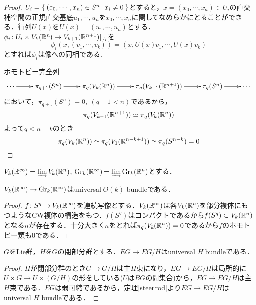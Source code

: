 \begin{proof}
  $U_i=\left\{\:(x_0,\cdots,x_n)\in S^n\:\middle|\:x_i\neq 0\:\right\}$とすると，$x=(x_0,\cdots,x_n)\in U_i$の直交補空間の正規直交基底$u_1,\cdots,u_n$を$x_0,\cdots,x_n$に関してなめらかにとることができる．行列$U(x)$を$U(x)=(u_1,\cdots,u_n)$とする．$\phi_i\colon U_i\times V_k(\mathbb{R}^n)\rightarrow V_{k+1}(\mathbb{R}^{n+1})|_{U_i}$を
  \[
  \phi_i(x,(v_1,\cdots,v_k)) = (x,U(x)v_1,\cdots,U(x)v_k)
  \]
  とすれば$\phi_i$は像への同相である．

  ホモトピー完全列
  \[
  \xymatrix{
    \cdots \ar[r] & \pi_{q+1}(S^n) \ar[r] & \pi_q(V_k(\real^n)) \ar[r] &
    \pi_q(V_{k+1}(\real^{n+1})) \ar[r] & \pi_q(S^n) \ar[r] & \cdots
  }
  \]
  において，$\pi_{q+1}(S^n) = 0,\:(q+1 < n)$であるから，
  \[
  \pi_q(V_{k+1}(\mathbb{R}^{n+1}))\simeq \pi_q(V_{k}(\mathbb{R}^{n}))
  \]
  よって$q<n-k$のとき
  \[
  \pi_q(V_k(\mathbb{R}^n))\simeq \pi_q(V_1(\mathbb{R}^{n-k+1}))\simeq \pi_q(S^{n-k})=0
  \]
\end{proof}

$V_k(\mathbb{R}^\infty)=\varinjlim V_k(\mathbb{R}^n)$, $\text{Gr}_k(\mathbb{R}^\infty)=\varinjlim \text{Gr}_k(\mathbb{R}^n)$とする．

\begin{prop}\label{universal O(k) bundle}
  $V_k(\mathbb{R}^\infty)\rightarrow \text{Gr}_k(\mathbb{R}^\infty)$はuniversal $O(k)$ bundleである．
\end{prop}

\begin{proof}
  $f\colon S^q\rightarrow V_k(\mathbb{R}^\infty)$を連続写像とする．$V_k(\mathbb{R}^\infty)$は各$V_k(\mathbb{R}^n)$を部分複体にもつようなCW複体の構造をもつ．$f(S^q)$はコンパクトであるから$f(S^q)\subset V_k(\mathbb{R}^n)$となる$n$が存在する\cite{hatcher Top}．十分大きく$n$をとれば$\pi_q(V_k(\mathbb{R}^n))=0$であるから$f$のホモトピー類も$0$である．
\end{proof}

\begin{theo}\label{universal bundle for subgroup}
  $G$をLie群，$H$を$G$の閉部分群とする．$EG\rightarrow EG/H$はuniversal $H$ bundleである．
\end{theo}

\begin{proof}
  $H$が閉部分群のとき$G\rightarrow G/H$は主$H$束になり，$EG\rightarrow EG/H$は局所的に$U\times G\rightarrow U\times(G/H)$の形をしている($U$は$BG$の開集合)から，$EG\rightarrow EG/H$は主$H$束である．$EG$は弱可縮であるから，定理\ref{steenrod}より$EG\rightarrow EG/H$はuniversal $H$ bundleである．
\end{proof}

